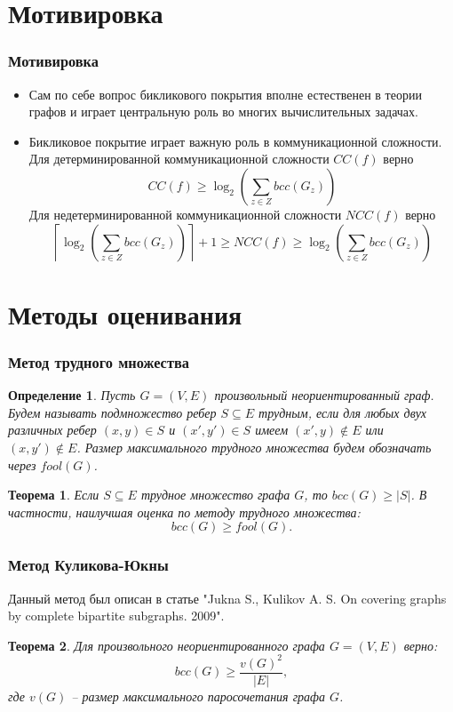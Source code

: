 \documentclass[utf8]{beamer}
\newtheorem{mdefinition}{Определение}[section]
\newtheorem{mtheorem}{Теорема}
\begin{document}
	\section{Мотивировка}
	\begin{frame}
		\frametitle{Мотивировка}
		\begin{itemize}
		    \item[1)] Сам по себе вопрос бикликового покрытия вполне естественен в теории графов и 
		    играет центральную роль во многих вычислительных задачах.
		    \item[2)] Бикликовое покрытие играет важную роль в коммуникационной сложности. Для детерминированной 
		    коммуникационной сложности $CC(f)$ верно $$CC(f) \geq \log_2 \left(\sum\limits_{z\in Z}bcc(G_z)\right)$$ 
		    Для недетерминированной коммуникационной сложности $NCC(f)$ верно $$\left\lceil\log_2 \left(\sum\limits_{z\in Z}bcc(G_z)\right)\right\rceil + 1 
		    \geq NCC(f) \geq \log_2 \left(\sum\limits_{z\in Z}bcc(G_z)\right)$$
		\end{itemize}
	\end{frame}
	
	\section{Методы оценивания}
	\begin{frame}
		\frametitle{Метод трудного множества}
		\begin{mdefinition}
		    Пусть $G = (V, E)$ произвольный неориентированный граф. Будем называть подмножество ребер 
		    $S \subseteq E$ трудным, если для любых двух различных ребер $(x, y) \in S$ и $(x', y') \in S$
		    имеем $(x', y) \notin E$ или $(x, y') \notin E$. Размер максимального трудного множества 
		    будем обозначать через $fool(G)$. 
		\end{mdefinition}
		
		\begin{mtheorem}
		    Если $S \subseteq E$ трудное множество графа $G$, то $bcc(G) \geq |S|$. В частности, 
		    наилучшая оценка по методу трудного множества: $$bcc(G) \geq fool(G).$$  
		\end{mtheorem}
	\end{frame}
	
	\begin{frame}
		\frametitle{Метод Куликова-Юкны}
		Данный метод был описан в статье "Jukna S., Kulikov A. S. On covering graphs by complete 
		bipartite subgraphs. 2009".
		
		\begin{mtheorem}
		    Для произвольного неориентированного графа $G = (V, E)$ верно: $$bcc(G) \geq \frac{v(G)^2}{|E|},$$ 
		    где $v(G)$ -- размер максимального паросочетания графа $G$.
		\end{mtheorem}
	\end{frame}
	
\end{document}
